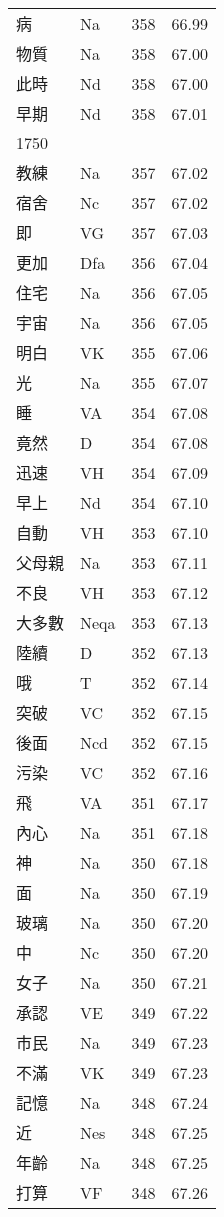 \documentclass[twocolumn]{book}
\begin{document}
\begin{supertabular}{llrr}
病 & Na & 358 &  66.99\\
物質 & Na & 358 &  67.00\\
此時 & Nd & 358 &  67.00\\
早期 & Nd & 358 &  67.01\\
1750\\
教練 & Na & 357 &  67.02\\
宿舍 & Nc & 357 &  67.02\\
即 & VG & 357 &  67.03\\
更加 & Dfa & 356 &  67.04\\
住宅 & Na & 356 &  67.05\\
宇宙 & Na & 356 &  67.05\\
明白 & VK & 355 &  67.06\\
光 & Na & 355 &  67.07\\
睡 & VA & 354 &  67.08\\
竟然 & D & 354 &  67.08\\
迅速 & VH & 354 &  67.09\\
早上 & Nd & 354 &  67.10\\
自動 & VH & 353 &  67.10\\
父母親 & Na & 353 &  67.11\\
不良 & VH & 353 &  67.12\\
大多數 & Neqa & 353 &  67.13\\
陸續 & D & 352 &  67.13\\
哦 & T & 352 &  67.14\\
突破 & VC & 352 &  67.15\\
後面 & Ncd & 352 &  67.15\\
污染 & VC & 352 &  67.16\\
飛 & VA & 351 &  67.17\\
內心 & Na & 351 &  67.18\\
神 & Na & 350 &  67.18\\
面 & Na & 350 &  67.19\\
玻璃 & Na & 350 &  67.20\\
中 & Nc & 350 &  67.20\\
女子 & Na & 350 &  67.21\\
承認 & VE & 349 &  67.22\\
市民 & Na & 349 &  67.23\\
不滿 & VK & 349 &  67.23\\
記憶 & Na & 348 &  67.24\\
近 & Nes & 348 &  67.25\\
年齡 & Na & 348 &  67.25\\
打算 & VF & 348 &  67.26\\

\end{supertabular}
\end{document}
